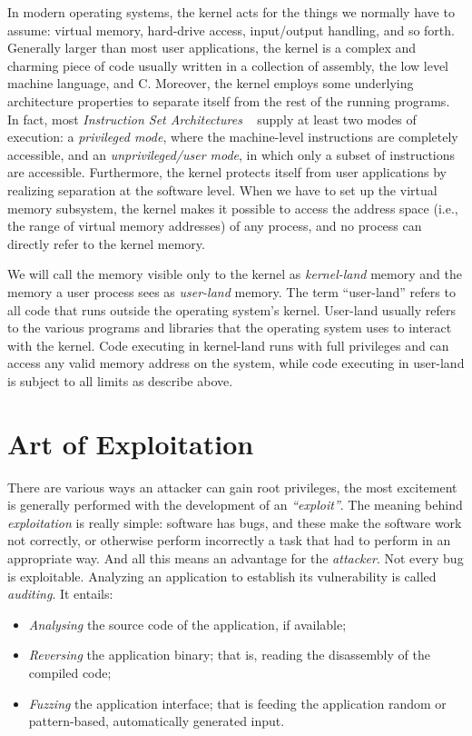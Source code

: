 \documentclass{masterthesis}
\begin{document}
In modern operating systems, the kernel acts for the things we normally have to assume: virtual memory, hard-drive access, input/output handling, and so forth. Generally larger than most user applications, the kernel is a complex and charming piece of code usually written in a collection of assembly, the low level machine language, and C.
Moreover, the kernel employs some underlying architecture properties to separate itself from the rest of the running programs.
In fact, most \emph{Instruction Set Architectures} ~\cite{silberman1993architectural} supply at least two modes of execution: a \emph{privileged mode}, where the machine-level instructions are completely accessible, and an \emph{unprivileged/user mode}, in which only a subset of instructions are accessible.
Furthermore, the kernel protects itself from user applications by realizing separation at the software level.
When we have to set up the virtual memory subsystem, the kernel makes it possible to access the address space (i.e., the range of virtual memory addresses) of any process, and no process can directly refer to the kernel memory.
 
We will call the memory visible only to the kernel as \emph{kernel-land} memory and the memory a user process sees as \emph{user-land} memory. The term ``user-land'' refers to all code that runs outside the operating system's kernel. User-land usually refers to the various programs and libraries that the operating system uses to interact with the kernel.
Code executing in kernel-land runs with full privileges and can access any valid memory address on the system, while code executing in user-land is subject to all limits as describe above.


\section{Art of Exploitation}
\label{sect:exploitation}

There are various ways an attacker can gain root privileges, the most excitement is generally performed with the development of an \emph{``exploit''}.
The meaning behind \emph{exploitation} is really simple: software has bugs, and these make the software work not correctly, or otherwise perform incorrectly a task that had to perform in an appropriate way.
And all this means an advantage for the \emph{attacker}. Not every bug is exploitable.
Analyzing an application to establish its vulnerability is called \emph{auditing}. It entails:
\begin{itemize}
\item \emph{Analysing} the source code of the application, if available;
\item \emph{Reversing} the application binary; that is, reading the disassembly of the compiled code;
\item \emph{Fuzzing} the application interface; that is feeding the application random or pattern-based, automatically generated input.
\end{itemize}
\end{document}

